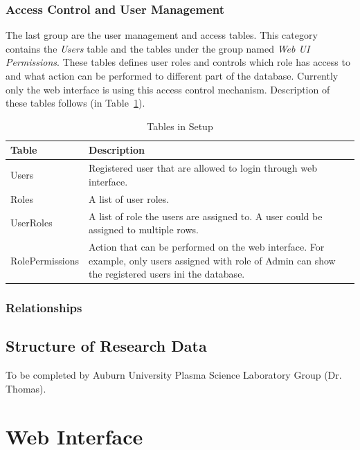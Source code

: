 \documentclass{sig-alternate}
\begin{document}
\subsubsection{Access Control and User Management}

The last group are the user management and access tables. This category contains the \emph{Users} table and the tables under the group named \emph{Web UI Permissions}. These tables defines user roles and controls which role has access to and what action can be performed to different part of the database. Currently only the web interface is using this access control mechanism. Description of these tables follows (in Table~\ref{tb_tables_in_access}).

\begin{table}[h]
\centering
\caption{Tables in Setup}\label{tb_tables_in_access}
\begin{tabular}{l p{5.6cm}} \hline
{\bf Table} 		& {\bf Description}\\ \hline
Users 			& Registered user that are allowed to login through web interface.\\ \hline
Roles			& A list of user roles.\\ \hline
UserRoles		& A list of role the users are assigned to. A user could be assigned to multiple rows. \\ \hline
RolePermissions	& Action that can be performed on the web interface. For example, only users assigned with role of Admin can show the registered users ini the database.\\ \hline
\end{tabular}
\end{table}


\subsubsection{Relationships}



\subsection{Structure of Research Data}

To be completed by Auburn University Plasma Science Laboratory Group (Dr. Thomas).

\section{Web Interface}
\end{document}
